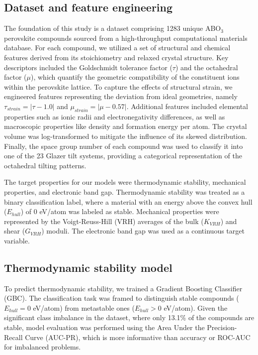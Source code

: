 \documentclass[]{article}
\begin{document}
\subsection{Dataset and feature engineering}
The foundation of this study is a dataset comprising 1283 unique ABO$_3$ perovskite compounds sourced from a high-throughput computational materials database. For each compound, we utilized a set of structural and chemical features derived from its stoichiometry and relaxed crystal structure. Key descriptors included the Goldschmidt tolerance factor ($\tau$) and the octahedral factor ($\mu$), which quantify the geometric compatibility of the constituent ions within the perovskite lattice. To capture the effects of structural strain, we engineered features representing the deviation from ideal geometries, namely $\tau_{strain} = |\tau - 1.0|$ and $\mu_{strain} = |\mu - 0.57|$. Additional features included elemental properties such as ionic radii and electronegativity differences, as well as macroscopic properties like density and formation energy per atom. The crystal volume was log-transformed to mitigate the influence of its skewed distribution. Finally, the space group number of each compound was used to classify it into one of the 23 Glazer tilt systems, providing a categorical representation of the octahedral tilting patterns.

The target properties for our models were thermodynamic stability, mechanical properties, and electronic band gap. Thermodynamic stability was treated as a binary classification label, where a material with an energy above the convex hull ($E_{hull}$) of 0 eV/atom was labeled as stable. Mechanical properties were represented by the Voigt-Reuss-Hill (VRH) averages of the bulk ($K_{VRH}$) and shear ($G_{VRH}$) moduli. The electronic band gap was used as a continuous target variable.

\subsection{Thermodynamic stability model}
To predict thermodynamic stability, we trained a Gradient Boosting Classifier (GBC). The classification task was framed to distinguish stable compounds ($E_{hull} = 0$ eV/atom) from metastable ones ($E_{hull} > 0$ eV/atom). Given the significant class imbalance in the dataset, where only 13.1\% of the compounds are stable, model evaluation was performed using the Area Under the Precision-Recall Curve (AUC-PR), which is more informative than accuracy or ROC-AUC for imbalanced problems.
\end{document}
